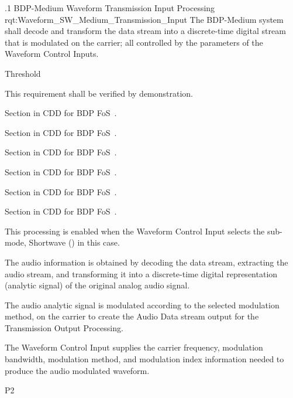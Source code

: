\ONERQMTVKPP
{\RqtNumberBase.1}
{BDP-Medium \SW Waveform Transmission Input Processing}
{rqt:Waveform_SW_Medium_Transmission_Input}
{The BDP-Medium system shall decode and transform the \MPEGTS data stream into a discrete-time digital stream that is modulated on the \RF carrier; all controlled by the parameters of the Waveform Control Inputs.}
{
	\item [Phase 1]  Threshold
}
{This requirement shall be verified by demonstration.}
{
	\item [5.1.1] Section in CDD for BDP FoS~\cite{ref__BDP_FOS_CDD}.
	\item [5.1.2] Section in CDD for BDP FoS~\cite{ref__BDP_FOS_CDD}.
	\item [5.5.1] Section in CDD for BDP FoS~\cite{ref__BDP_FOS_CDD}.
	\item [5.5.2] Section in CDD for BDP FoS~\cite{ref__BDP_FOS_CDD}.
	\item [5.5.3] Section in CDD for BDP FoS~\cite{ref__BDP_FOS_CDD}.
	\item [5.5.4] Section in CDD for BDP FoS~\cite{ref__BDP_FOS_CDD}.
}
{
	\item This processing is enabled when the Waveform Control Input selects the sub-mode, Shortwave (\SW) in this case.
	\item The audio information is obtained by decoding the \MPEGTS data stream, extracting the audio stream, and transforming it into a discrete-time digital representation (analytic signal) of the original analog audio signal.
	\item The audio analytic signal is modulated according to the selected modulation method, on the \RF carrier to create the Audio Data stream output for the Transmission Output Processing.
	\item The Waveform Control Input supplies the \RF carrier frequency, modulation bandwidth, modulation method, and modulation index information needed to produce the audio modulated \RF waveform.
}
{P2}


